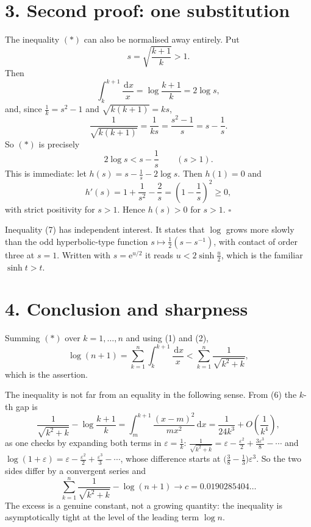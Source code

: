 \documentclass[12pt]{article}
\newcommand{\dd}{\,\mathrm{d}}
\newcommand{\e}{\mathrm{e}}
\newcommand{\Mid}{m}
\begin{document}
\section*{3. Second proof: one substitution}

The inequality \((\ast)\) can also be normalised away entirely. Put
\[
s=\sqrt{\frac{k+1}{k}}>1 .
\]
Then
\[
\int_k^{k+1}\frac{\dd x}{x}=\log\frac{k+1}{k}=2\log s,
\]
and, since \(\frac1k=s^2-1\) and \(\sqrt{k(k+1)}=ks\),
\[
\frac1{\sqrt{k(k+1)}}=\frac1{ks}=\frac{s^2-1}{s}=s-\frac1s .
\]
So \((\ast)\) is precisely
\[
\boxed{\displaystyle 2\log s<s-\frac1s\qquad (s>1).}
\tag{7}
\]
This is immediate: let \(h(s)=s-\frac1s-2\log s\). Then \(h(1)=0\) and
\[
h'(s)=1+\frac1{s^2}-\frac2s=\left(1-\frac1s\right)^2\ge0,
\]
with strict positivity for \(s>1\). Hence \(h(s)>0\) for \(s>1\). \(\square\)

Inequality (7) has independent interest. It states
that \(\log\) grows more slowly than the odd hyperbolic-type function
\(s\mapsto\frac12(s-s^{-1})\), with contact of order three at \(s=1\).
Written with \(s=\e^{u/2}\) it reads \(u<2\sinh\frac u2\), which is the
familiar \(\sinh t>t\).

\section*{4. Conclusion and sharpness}

Summing \((\ast)\) over \(k=1,\dots,n\) and using (1) and (2),
\[
\log(n+1)=\sum_{k=1}^{n}\int_k^{k+1}\frac{\dd x}{x}
<\sum_{k=1}^{n}\frac1{\sqrt{k^2+k}},
\]
which is the assertion.

The inequality is not far from an equality in the following sense. From
(6) the \(k\)-th gap is
\[
\frac1{\sqrt{k^2+k}}-\log\frac{k+1}{k}
=\int_{\Mid}^{k+1}\frac{(x-\Mid)^2}{\Mid x^2}\dd x
=\frac1{24k^3}+O\!\left(\frac1{k^4}\right),
\]
as one checks by expanding both terms in \(\varepsilon=\frac1k\):
\(\frac1{\sqrt{k^2+k}}=\varepsilon-\frac{\varepsilon^2}{2}+\frac{3\varepsilon^3}{8}-\cdots\)
and \(\log(1+\varepsilon)=\varepsilon-\frac{\varepsilon^2}{2}+\frac{\varepsilon^3}{3}-\cdots\),
whose difference starts at \(\bigl(\frac38-\frac13\bigr)\varepsilon^3\).
So the two sides differ by a convergent series and
\[
\sum_{k=1}^{n}\frac1{\sqrt{k^2+k}}-\log(n+1)\longrightarrow c
=0.0190285404\ldots
\]
The excess is a genuine constant, not a growing quantity: the inequality
is asymptotically tight at the level of the leading term \(\log n\).
\end{document}
